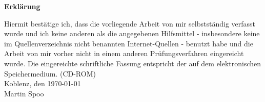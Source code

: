 \thispagestyle{empty}
\vspace*{3cm}
\begin{center}
	\Large{\textbf{Erklärung}}
\end{center}
\vspace*{1cm}
Hiermit bestätige ich, dass die vorliegende Arbeit von mir selbstständig verfasst wurde und ich keine anderen als die angegebenen Hilfsmittel - insbesondere keine im Quellenverzeichnis nicht benannten Internet-Quellen - benutzt habe und die Arbeit von mir vorher nicht in einem anderen Prüfungsverfahren eingereicht wurde.
Die eingereichte schriftliche Fassung entspricht der auf dem elektronischen Speichermedium. (CD-ROM)
\vspace*{1cm}\\
Koblenz, den \today
\vspace*{0.75cm}\\
Martin Spoo
\restoregeometry
